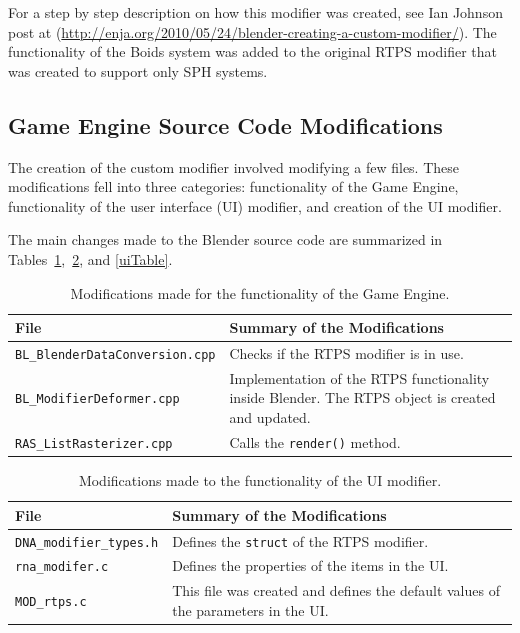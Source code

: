 For a step by step description on how this modifier was created, see Ian Johnson post at (\url{http://enja.org/2010/05/24/blender-creating-a-custom-modifier/}).  The functionality of the Boids system was added to the original RTPS modifier that was created to support only SPH systems. 

\subsection{Game Engine Source Code Modifications}
The creation of the custom modifier involved modifying a few files. These modifications fell into three categories: functionality of the Game Engine, functionality of the user interface (UI) modifier, and  creation of the UI modifier.

The main changes made to the Blender source code are summarized in Tables~\ref{geTable},~\ref{funcTable}, and \ref{uiTable}.


\vspace{16pt}
\begin{table}[htdp]
\caption{Modifications made for the functionality of the Game Engine.}
\begin{center}
\begin{tabular}{|p{6cm}|p{6cm}|}
\hline 
\textbf{File} & \textbf{Summary of the Modifications} \\\hline 
\texttt{BL\_BlenderDataConversion.cpp} & Checks if the RTPS modifier is in use. \\\hline 
\texttt{BL\_ModifierDeformer.cpp} & Implementation of the RTPS functionality inside Blender. The RTPS object is created and updated. \\\hline 
\texttt{RAS\_ListRasterizer.cpp} & Calls the \texttt{render()} method. \\
\hline 
\end{tabular} 
\end{center}
\label{geTable}
\end{table}

\vspace{16pt}
\begin{table}[htdp]
\caption{Modifications made to the functionality of the UI modifier.}
\begin{center}
\begin{tabular}{|p{6cm}|p{6cm}|}
\hline 
\textbf{File} & \textbf{Summary of the Modifications} \\\hline 
\texttt{DNA\_modifier\_types.h} & Defines the \texttt{struct} of the RTPS modifier. \\\hline 
\texttt{rna\_modifer.c} & Defines the properties of the items in the UI. \\\hline 
\texttt{MOD\_rtps.c} & This file was created and defines the default values of the parameters in the UI. \\
\hline 
\end{tabular}
\end{center}
\label{funcTable}
\end{table}

